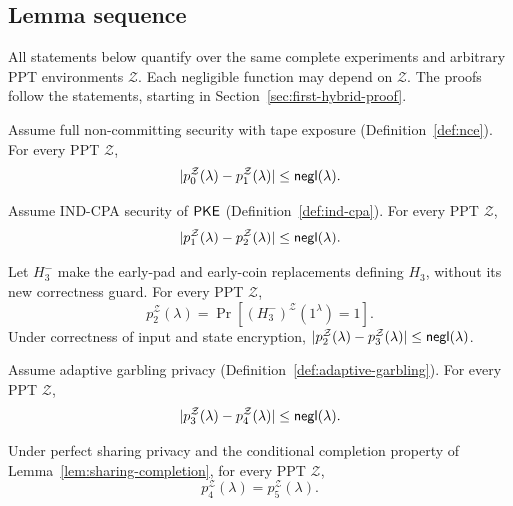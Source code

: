\subsection{Lemma sequence}
\label{sec:hybrid-lemmas}

All statements below quantify over the same complete experiments and
arbitrary PPT environments $\mathcal Z$.  Each negligible function may
depend on $\mathcal Z$.  The proofs follow the statements, starting in
Section~\ref{sec:first-hybrid-proof}.


\begin{lemma}
\label{lem:restore-input-encryption}
Assume full non-committing security with tape exposure
(Definition~\ref{def:nce}).  For every PPT $\mathcal Z$,
\[
 |p_0^{\mathcal Z}(\lambda)-p_1^{\mathcal Z}(\lambda)|
 \leq\mathop{\mathsf{negl}}(\lambda).
\]
\end{lemma}

\begin{lemma}
\label{lem:restore-state-ciphertexts}
Assume IND-CPA security of $\mathsf{PKE}$ (Definition~\ref{def:ind-cpa}).
For every PPT $\mathcal Z$,
\[
 |p_1^{\mathcal Z}(\lambda)-p_2^{\mathcal Z}(\lambda)|
 \leq\mathop{\mathsf{negl}}(\lambda).
\]
\end{lemma}

\begin{lemma}
\label{lem:fix-circuit-constants}
Let $H_3^-$ make the early-pad and early-coin replacements defining
$H_3$, without its new correctness guard.  For every PPT $\mathcal Z$,
\[
 p_2^{\mathcal Z}(\lambda)
   =\Pr[(H_3^-)^{\mathcal Z}(1^\lambda)=1].
\]
Under correctness of input and state encryption,
$|p_2^{\mathcal Z}(\lambda)-p_3^{\mathcal Z}(\lambda)|
\leq\mathop{\mathsf{negl}}(\lambda)$.
\end{lemma}

\begin{lemma}
\label{lem:restore-garblings}
Assume adaptive garbling privacy
(Definition~\ref{def:adaptive-garbling}).  For every PPT $\mathcal Z$,
\[
 |p_3^{\mathcal Z}(\lambda)-p_4^{\mathcal Z}(\lambda)|
 \leq\mathop{\mathsf{negl}}(\lambda).
\]
\end{lemma}

\begin{lemma}
\label{lem:restore-sharings}
Under perfect sharing privacy and the conditional completion property
of Lemma~\ref{lem:sharing-completion}, for every PPT $\mathcal Z$,
\[
 p_4^{\mathcal Z}(\lambda)=p_5^{\mathcal Z}(\lambda).
\]
\end{lemma}

